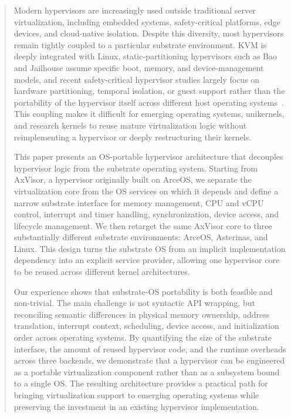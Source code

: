 \begin{abstract}
Modern hypervisors are increasingly used outside traditional server virtualization, including embedded systems, safety-critical platforms, edge devices, and cloud-native isolation. Despite this diversity, most hypervisors remain tightly coupled to a particular substrate environment. KVM is deeply integrated with Linux, static-partitioning hypervisors such as Bao and Jailhouse assume specific boot, memory, and device-management models, and recent safety-critical hypervisor studies largely focus on hardware partitioning, temporal isolation, or guest support rather than the portability of the hypervisor itself across different host operating systems~\cite{li2019acrn,martins2020lightweight,lozano2023comprehensive,martins2023shedding}. This coupling makes it difficult for emerging operating systems, unikernels, and research kernels to reuse mature virtualization logic without reimplementing a hypervisor or deeply restructuring their kernels.

This paper presents an OS-portable hypervisor architecture that decouples hypervisor logic from the substrate operating system. Starting from AxVisor, a hypervisor originally built on ArceOS, we separate the virtualization core from the OS services on which it depends and define a narrow substrate interface for memory management, CPU and vCPU control, interrupt and timer handling, synchronization, device access, and lifecycle management. We then retarget the same AxVisor core to three substantially different substrate environments: ArceOS, Asterinas, and Linux. This design turns the substrate OS from an implicit implementation dependency into an explicit service provider, allowing one hypervisor core to be reused across different kernel architectures.

Our experience shows that substrate-OS portability is both feasible and non-trivial. The main challenge is not syntactic API wrapping, but reconciling semantic differences in physical memory ownership, address translation, interrupt context, scheduling, device access, and initialization order across operating systems. By quantifying the size of the substrate interface, the amount of reused hypervisor code, and the runtime overheads across three backends, we demonstrate that a hypervisor can be engineered as a portable virtualization component rather than as a subsystem bound to a single OS. The resulting architecture provides a practical path for bringing virtualization support to emerging operating systems while preserving the investment in an existing hypervisor implementation.
\end{abstract}


